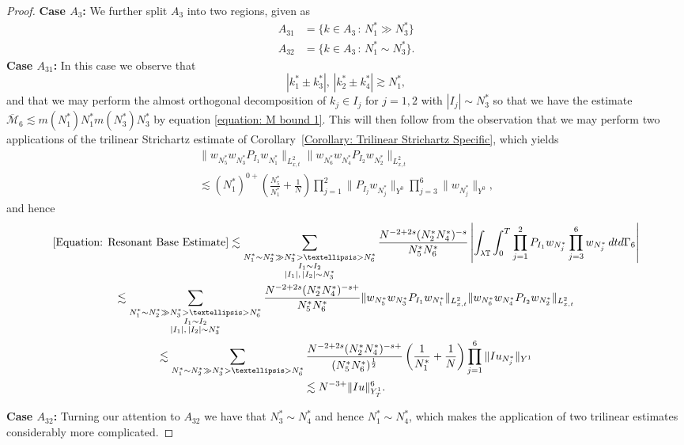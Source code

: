 \documentclass[12pt, letterpaper]{amsart}
\begin{document}
\begin{proof}
    \textbf{Case $A_3$: } We further split $A_3$ into two regions, given as
    \begin{align*}
        A_{31} &= \{k\in A_3\,:\,N_1^*\gg N_3^*\}\\
        A_{32} &= \{k\in A_3\,:\, N_1^*\sim N_3^*\}.
    \end{align*}
    \textbf{Case $A_{31}$:} In this case we observe that
    \[
    |k_1^*\pm k_3^*|,\,|k_2^*\pm k_4^*|\gtrsim N_1^*,
    \]
    and that we may perform the almost orthogonal decomposition of $k_j\in I_j$ for $j = 1,2$ with $|I_j|\sim N_3^*$ so that we have the estimate $\overline{\mathcal{M}}_6\lesssim m(N_1^*)N_1^*m(N_3^*)N_3^*$ by equation \eqref{equation: M bound 1}. This will then follow from the observation that we may perform two applications of the trilinear Strichartz estimate of Corollary~\ref{Corollary: Trilinear Strichartz Specific}, which yields
    \begin{multline*}
    \|w_{N_5^*}w_{N_3^*}P_{I_1}w_{N_1^*}\|_{L^2_{x,t}}\|w_{N_6^*}w_{N_4^*}P_{I_2}w_{N_2^*}\|_{L^2_{x,t}}\\
    \lesssim (N_1^*)^{0+}\left(\frac{N_5^*}{N_1^*}+\frac{1}{N}\right)\prod_{j=1}^2 \|P_{I_j}w_{N_j^*}\|_{Y^0}\prod_{j=3}^6\|w_{N_j^*}\|_{Y^0},
    \end{multline*}
    and hence
    \begin{multline*}
        \eqref{Equation: Resonant Base Estimate}\lesssim \sum_{\substack{N_1^*\sim N_2^*\gg N_3^*>\dots> N_6^*\\I_1\sim I_2\\|I_1|,\,|I_2|\sim N_3^*}}\frac{N^{-2+2s}(N_{2}^*N_4^*)^{-s}}{N_5^*N_6^*}\left|\int_{\lambda\mathbb{T}}\int_0^T\prod_{j=1}^2P_{I_1}w_{N_j^*}\prod_{j=3}^6w_{N_j^*}\,dtd\Gamma_6\right|\\
        \lesssim \sum_{\substack{N_1^*\sim N_2^*\gg N_3^*>\dots> N_6^*\\I_1\sim I_2\\|I_1|,\,|I_2|\sim N_3^*}}\frac{N^{-2+2s}(N_{2}^*N_4^*)^{-s+}}{N_5^*N_6^*}\|w_{N_5^*}w_{N_3^*}P_{I_1}w_{N_1^*}\|_{L^2_{x,t}}\|w_{N_6^*}w_{N_4^*}P_{I_2}w_{N_2^*}\|_{L^2_{x,t}}\\
        \lesssim\sum_{N_1^*\sim N_2^*\gg N_3^*>\dots> N_6^*}\frac{N^{-2+2s}(N_{2}^*N_4^*)^{-s+}}{(N_5^*N_6^*)^{\frac12}}\left(\frac{1}{N_1^*} + \frac{1}{N}\right)\prod_{j=1}^6 \|Iu_{N_j^*}\|_{Y^1}\\
        \lesssim N^{-3+}\|Iu\|_{Y^1_T}^6.
    \end{multline*}
    
    \textbf{Case $A_{32}$:} Turning our attention to $A_{32}$ we have that $N_3^*\sim N_4^*$ and hence $N_1^*\sim N_4^*$, which makes the application of two trilinear estimates considerably more complicated.


\end{proof}
\end{document}

